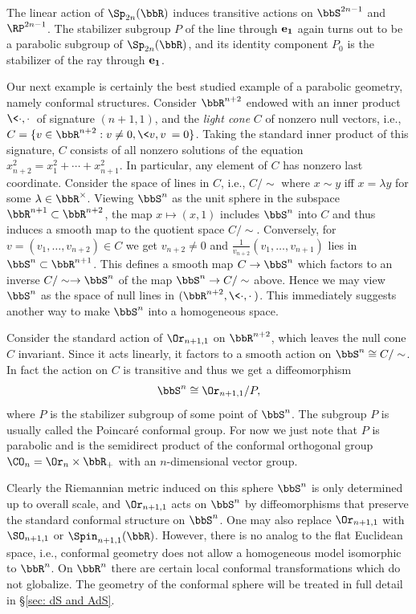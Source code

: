 \begin{defn}
    The linear action of $\Sp_{2n}(\bbR)$ induces transitive actions on $\bbS^{2n-1}$ and $\RP^{2n-1}$. The stabilizer subgroup $P$ of the line through $\bf{e}_1$ again turns out to be a parabolic subgroup of $\Sp_{2n}(\bbR)$, and its identity component $P_0$ is the stabilizer of the ray through $\bf{e}_1$.
\end{defn}


Our next example is certainly the best studied example of a parabolic geometry, namely conformal structures. Consider $\bbR^{n+2}$ endowed with an inner product $\<\cdot,\cdot\>$ of signature $(n+1,1)$, and the \emph{light cone} $C$ of nonzero null vectors, i.e., $C=\{v\in\bbR^{n+2}:v\neq 0,\<v,v\>=0\}$. Taking the standard inner product of this signature, $C$ consists of all nonzero solutions of the equation $x_{n+2}^2=x_1^2+\cdots +x_{n+1}^2$. In particular, any element of $C$ has nonzero last coordinate. Consider the space of lines in $C$, i.e., $C\slash \sim$ where $x\sim y$ iff $x=\lambda y$ for some $\lambda \in \bbR^\times$. Viewing $\bbS^n$ as the unit sphere in the subspace $\bbR^{n+1}\subset \bbR^{n+2}$, the map $x\mapsto (x,1)$ includes $\bbS^n$ into $C$ and thus induces a smooth map to the quotient space $C\slash \sim$. Conversely, for $v=(v_1,\ldots,v_{n+2})\in C$ we get $v_{n+2}\neq 0$ and $\frac{1}{v_{n+2}}(v_1,\ldots,v_{n+1})$ lies in $\bbS^n\subset \bbR^{n+1}$. This defines a smooth map $C\to \bbS^n$ which factors to an inverse $C\slash \sim\to \bbS^n$ of the map $\bbS^n\to C\slash \sim$ above. Hence we may view $\bbS^n$ as the space of null lines in $(\bbR^{n+2},\<\cdot,\cdot\>)$. This immediately suggests another way to make $\bbS^n$ into a homogeneous space.

\begin{defn}
    Consider the standard action of $\Or_{n+1,1}$ on $\bbR^{n+2}$, which leaves the null cone $C$ invariant. Since it acts linearly, it factors to a smooth action on $\bbS^n\cong C\slash \sim$. In fact the action on $C$ is transitive and thus we get a diffeomorphism
    \[\bbS^n\cong \Or_{n+1,1}\slash P,\]
    where $P$ is the stabilizer subgroup of some point of $\bbS^n$. The subgroup $P$ is usually called the Poincar\'e conformal group. For now we just note that $P$ is parabolic and is the semidirect product of the conformal orthogonal group $\CO_n=\Or_n\times\bbR_+$ with an $n$-dimensional vector group.
\end{defn}

Clearly the Riemannian metric induced on this sphere $\bbS^n$ is only determined up to overall scale, and $\Or_{n+1,1}$ acts on $\bbS^n$ by diffeomorphisms that preserve the standard conformal structure on $\bbS^n$. One may also replace $\Or_{n+1,1}$ with $\SO_{n+1,1}$ or $\Spin_{n+1,1}(\bbR)$. However, there is no analog to the flat Euclidean space, i.e., conformal geometry does not allow a homogeneous model isomorphic to $\bbR^n$. On $\bbR^n$ there are certain local conformal transformations which do not globalize. The geometry of the conformal sphere will be treated in full detail in \S\ref{sec: dS and AdS}.

